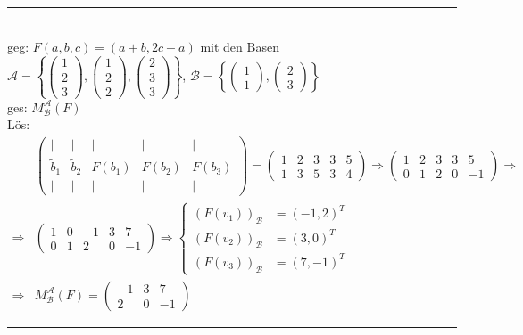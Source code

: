 \documentclass{article}
\begin{document}
\newpage


{\color{blue}
\hrule
	\\
	geg: $F(a,b,c) = (a+b, 2c-a)$ mit den Basen $\mathcal{A} = \left\{
	\begin{pmatrix}
		1\\2\\3
	\end{pmatrix},
	\begin{pmatrix}
		1\\2\\2
	\end{pmatrix},
	\begin{pmatrix}
		2\\3\\3
	\end{pmatrix}\right\}$, 
	$\mathcal{B} = \left\{
	\begin{pmatrix}
		1\\1
	\end{pmatrix},
	\begin{pmatrix}
		2\\3
	\end{pmatrix}
	\right\}$\\
	ges: $M_\mathcal{B}^\mathcal{A}(F)$\\
	Lös:
	\begin{align*}
		&		
		\left(\begin{array}{cc|c|c|c}
			| & | & | & | & | \\
			\tilde{b}_1 & \tilde{b}_2 & F(b_1) & F(b_2) & F(b_3) \\
			| & | & | & | & |
		\end{array}\right)
		=
		\left(\begin{array}{cc|c|c|c}
			1 & 2 & 3 & 3 & 5 \\
			1 & 3 & 5 & 3 & 4
		\end{array}\right)
		\Rightarrow
		\left(\begin{array}{cc|c|c|c}
			1 & 2 & 3 & 3 & 5 \\
			0 & 1 & 2 & 0 & -1
		\end{array}\right)
		\Rightarrow\\
		\Rightarrow &
		\left(\begin{array}{cc|c|c|c}
			1 & 0 & -1 & 3 & 7 \\
			0 & 1 & 2 & 0 & -1
		\end{array}\right)
		\Rightarrow
		\begin{cases}
			(F(v_1))_\mathcal{B} &= (-1,2)^T \\
			(F(v_2))_\mathcal{B} &= (3,0)^T \\
			(F(v_3))_\mathcal{B} &= (7,-1)^T
		\end{cases} \\
		\Rightarrow &
		M_{\mathcal{B}}^\mathcal{A}(F) = 
		\begin{pmatrix}
			-1 & 3 & 7 \\
			2 & 0 & -1
		\end{pmatrix}
	\end{align*}
\hrule
}
\end{document}
